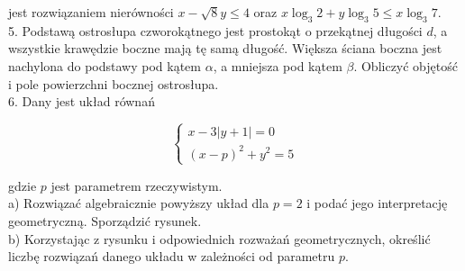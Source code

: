 \documentclass[10pt]{article}
\begin{document}
jest rozwiązaniem nierówności $x-\sqrt{8} y \leqslant 4$ oraz $x \log _{3} 2+y \log _{3} 5 \leqslant x \log _{3} 7$.\\
5. Podstawą ostrosłupa czworokątnego jest prostokąt o przekątnej długości $d$, a wszystkie krawędzie boczne mają tę samą długość. Większa ściana boczna jest nachylona do podstawy pod kątem $\alpha$, a mniejsza pod kątem $\beta$. Obliczyć objętość i pole powierzchni bocznej ostrosłupa.\\
6. Dany jest układ równań

$$
\left\{\begin{array}{l}
x-3|y+1|=0 \\
(x-p)^{2}+y^{2}=5
\end{array}\right.
$$

gdzie $p$ jest parametrem rzeczywistym.\\
a) Rozwiązać algebraicznie powyższy układ dla $p=2$ i podać jego interpretację geometryczną. Sporządzić rysunek.\\
b) Korzystając z rysunku i odpowiednich rozważań geometrycznych, określić liczbę rozwiązań danego układu w zależności od parametru $p$.
\end{document}
